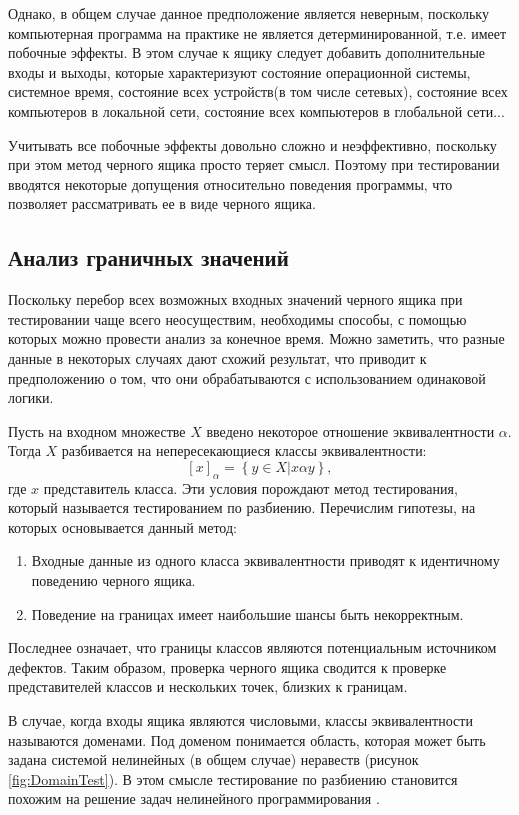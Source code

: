 \documentclass[a4paper,14pt,href]{article}
\begin{document}
	Однако, в общем случае данное предположение является неверным, поскольку компьютерная программа на практике не является детерминированной, т.е. имеет побочные эффекты. В этом случае к ящику следует добавить дополнительные входы и выходы, которые характеризуют состояние операционной системы, системное время, состояние всех устройств(в том числе сетевых), состояние всех компьютеров в локальной сети, состояние всех компьютеров в глобальной сети...

	Учитывать все побочные эффекты довольно сложно и неэффективно, поскольку при этом метод черного ящика просто теряет смысл. Поэтому при тестировании вводятся некоторые допущения относительно поведения программы, что позволяет рассматривать ее в виде черного ящика.

\subsection{Анализ граничных значений}
	Поскольку перебор всех возможных входных значений черного ящика при тестировании чаще всего неосуществим, необходимы способы, с помощью которых можно провести анализ за конечное время. Можно заметить, что разные данные в некоторых случаях дают схожий результат, что приводит к предположению о том, что они обрабатываются с использованием одинаковой логики. 
	
	Пусть на входном множестве $X$ введено некоторое отношение эквивалентности $\alpha$. Тогда $X$ разбивается на непересекающиеся классы эквивалентности:
	$$ [x]_{\alpha} = \left \{   y \in X | x \alpha y\right \}, $$
где $x$ представитель класса. Эти условия порождают метод тестирования, который называется тестированием по разбиению. Перечислим гипотезы, на которых основывается данный метод:

\begin{enumerate}
\item Входные данные из одного класса эквивалентности приводят к идентичному поведению черного ящика.
\item Поведение на границах имеет наибольшие шансы быть некорректным.
\end{enumerate}  

	Последнее означает, что границы классов являются потенциальным источником дефектов. Таким образом, проверка черного ящика сводится к проверке представителей классов и нескольких точек, близких к границам. 

	В случае, когда входы ящика являются числовыми, классы эквивалентности называются доменами\cite{TestingBlackBox}. Под доменом понимается область, которая может быть задана системой нелинейных (в общем случае) неравеств (рисунок \ref{fig:DomainTest}). В этом смысле тестирование по разбиению становится похожим на решение задач нелинейного программирования \cite{OptimisationMethods}.
\end{document}
